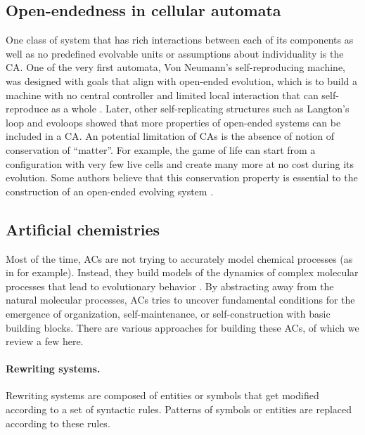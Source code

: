 \subsection{Open-endedness in cellular automata}
One class of system that has rich interactions between each of its components as
well as no predefined evolvable units or assumptions about individuality is the
\ac{CA}. One of the very first automata, Von Neumann's self-reproducing machine,
was designed with goals that align with open-ended evolution, which is to build
a machine with no central controller and limited local interaction that can
self-reproduce as a whole
\parencite{vonneumannTheorySelfreproducingAutomata1966,
  pesaventoImplementationNeumannSelfReproducing1995}. Later, other
self-replicating structures such as Langton's loop
\parencite{langtonSelfreproductionCellularAutomata1984} and evoloops
\parencite{sayamaNewStructurallyDissolvable1999,
  salzbergComplexGeneticEvolution2004} showed that more properties of open-ended
systems can be included in a \ac{CA}. An potential limitation of \acp{CA} is the
absence of notion of conservation of ``matter''. For example, the game of life
can start from a configuration with very few live cells and create many more at
no cost during its evolution. Some authors believe that this conservation
property is essential to the construction of an open-ended evolving system
\parencite{taylorChapterCreativityEvolution2002}.

\subsection{Artificial chemistries}
Most of the time, \acp{AC} are not trying to accurately model chemical processes
(as in \parencite{ostrovskyCellularAutomataPolymer2001} for example). Instead,
they build models of the dynamics of complex molecular processes that lead to
evolutionary behavior \parencite{dittrichArtificialChemistriesReview2001}. By
abstracting away from the natural molecular processes, \acp{AC} tries to uncover
fundamental conditions for the emergence of organization, self-maintenance, or
self-construction with basic building blocks. There are various approaches for
building these \aclp{AC}, of which we review a few here.

\paragraph{Rewriting systems.}
Rewriting systems are composed of entities or symbols that get modified
according to a set of syntactic rules. Patterns of symbols or entities are
replaced according to these rules.

